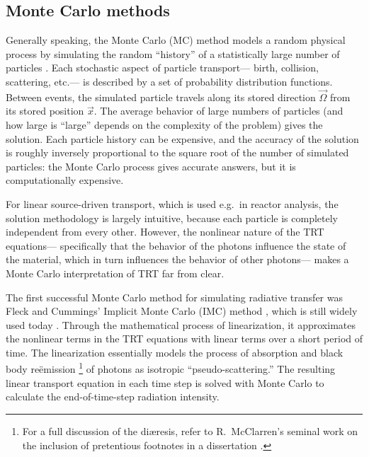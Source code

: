 \subsection{Monte Carlo methods}

Generally speaking, the Monte Carlo (MC) method models a random
physical process by simulating the random ``history'' of a statistically large
number
of particles \cite{Bro2004a}. Each stochastic aspect of particle transport---%
birth, collision, scattering, etc.---%
is described by a set of probability distribution functions. Between
events, the simulated particle travels along its stored direction
$\vec{\Omega}$ from its stored position $\vec{x}$. The average behavior of
large numbers of particles (and how large is ``large'' depends on the
complexity of the problem) gives the solution. Each particle history can be
expensive, and the accuracy of the solution is roughly inversely proportional
to the
square root of the number of simulated particles: the Monte Carlo process
gives accurate answers, but it is computationally expensive. 

For linear source-driven transport, which is used e.g.~in reactor analysis, the
solution
methodology is largely intuitive, because each particle is
completely independent from every other. However, the nonlinear nature of the
TRT equations---%
specifically that the behavior of the photons influence the state of the
material, which in turn influences the behavior of other photons---%
makes a Monte Carlo interpretation of TRT far from clear.

The first successful Monte Carlo method for simulating radiative
transfer was Fleck and Cummings' Implicit Monte Carlo (IMC) method
\cite{Fle1971,Wol2008}, which is still widely used today \cite{Urb2006}.
Through the
mathematical process of linearization, it approximates the nonlinear terms in
the TRT equations with linear terms over a short period of time. The
linearization essentially models the process of absorption and
black body re\"emission%
\footnote{For a full discussion of the di\ae resis, refer to R.~McClarren's seminal
work on the inclusion of pretentious footnotes in a dissertation
\cite[p.18]{McC2007}.}%
of photons as isotropic ``pseudo-scattering.'' The resulting linear
transport equation in each time step is solved with Monte Carlo to calculate the
end-of-time-step radiation intensity.

